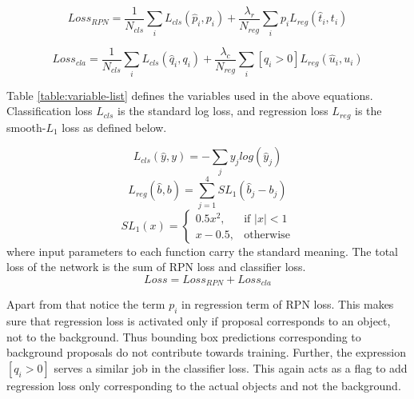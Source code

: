 $$Loss_{RPN}= \frac{1}{N_{cls}}\sum_i L_{cls}(\hat{p}_i,p_i) + \frac{\lambda_r}{N_{reg}}\sum_i p_i L_{reg}(\hat{t}_i,t_i)$$

\begin{small}
$$Loss_{cla} = \frac{1}{N_{cls}}\sum_i L_{cls}(\hat{q}_i,q_i) + \frac{\lambda_c}{N_{reg}}\sum_i [q_i > 0] L_{reg}(\hat{u}_i,u_i)$$
\end{small}
Table \ref{table:variable-list} defines the variables used in the above equations. Classification loss $L_{cls}$ is the standard log loss, and regression loss $L_{reg}$ is the smooth-$L_1$ loss as defined below. 

$$ L_{cls}(\hat{y},y) = -\sum_j y_jlog(\hat{y}_j) $$
$$ L_{reg}(\hat{b},b) = \sum_{j=1}^4 SL_1(\hat{b}_j - b_j) $$
$$SL_1(x) = \begin{cases}
0.5x^2, & \text{if } |x|<1 \\
x-0.5,  & \text{otherwise}
\end{cases}
$$
where input parameters to each function carry the standard meaning. The total loss of the network is the sum of RPN loss and classifier loss.
$$ Loss = Loss_{RPN} + Loss_{cla} $$

Apart from that notice the term $p_i$ in regression term of RPN loss. This makes sure that regression loss is activated only if proposal corresponds to an object, not to the background.  Thus bounding box predictions corresponding to background proposals do not contribute towards training. Further, the expression $[q_i>0]$ serves a similar job in the classifier loss. This again acts as a flag to add regression loss only corresponding to the actual objects and not the background. 


